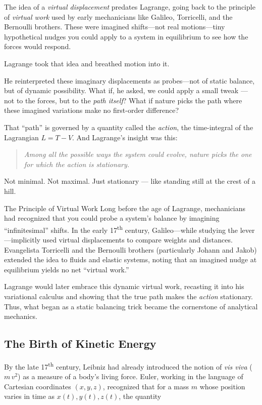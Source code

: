\medskip

The idea of a \textit{virtual displacement} predates Lagrange, going back to the principle of \textit{virtual work} used by early mechanicians like Galileo, Torricelli, and the Bernoulli brothers. These were imagined shifts—not real motions—tiny hypothetical nudges you could apply to a system in equilibrium to see how the forces would respond.

Lagrange took that idea and breathed motion into it.

He reinterpreted these imaginary displacements as probes—not of static balance, but of dynamic possibility. What if, he asked, we could apply a small tweak — not to the forces, but to the \textit{path itself}? What if nature picks the path where these imagined variations make no first-order difference?

That “path” is governed by a quantity called the \textit{action}, the time-integral of the Lagrangian \( L = T - V \). And Lagrange’s insight was this:

\begin{quote}
\textit{Among all the possible ways the system could evolve, nature picks the one for which the action is stationary.}
\end{quote}

Not minimal. Not maximal. Just stationary — like standing still at the crest of a hill.

\medskip

\begin{HistoricalSidebar}{The Principle of Virtual Work}
  Long before the age of Lagrange, mechanicians had recognized that you could probe a system’s balance by imagining “infinitesimal” shifts.  In the early 17\textsuperscript{th} century, Galileo—while studying the lever—implicitly used virtual displacements to compare weights and distances.  Evangelista Torricelli and the Bernoulli brothers (particularly Johann and Jakob) extended the idea to fluids and elastic systems, noting that an imagined nudge at equilibrium yields no net “virtual work.”  

  \medskip

  Lagrange would later embrace this dynamic virtual work, recasting it into his variational calculus and showing that the true path makes the \emph{action} stationary.  Thus, what began as a static balancing trick became the cornerstone of analytical mechanics.
\end{HistoricalSidebar}

\subsection{The Birth of Kinetic Energy}
By the late 17\textsuperscript{th} century, Leibniz had already introduced the notion of \emph{vis viva} (\(m\,v^2\)) as a measure of a body’s living force.  Euler, working in the language of Cartesian coordinates \((x,y,z)\), recognized that for a mass \(m\) whose position varies in time as \(x(t),y(t),z(t)\), the quantity

